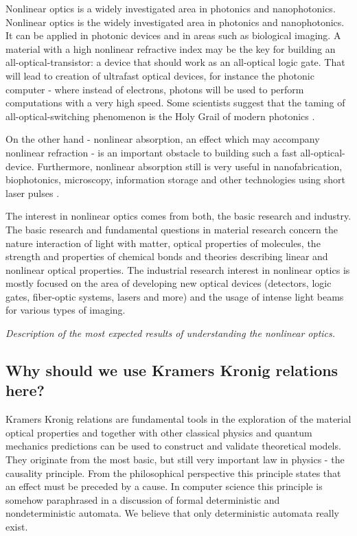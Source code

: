 \documentclass[12pt,twoside,a4paper]{article}
\numberwithin{equation}{subsection}
\numberwithin{figure}{subsection}
\begin{document}
Nonlinear optics is a widely investigated area in photonics and nanophotonics. Nonlinear optics is the widely investigated area
in photonics and nanophotonics. It can be applied in photonic devices and in areas such as biological imaging. A material
with a high nonlinear refractive index may be the key for building an all-optical-transistor: a device that should work as an
all-optical logic gate. That will lead to creation of ultrafast optical devices, for instance the photonic computer - where
instead of electrons, photons will be used to perform computations with a very high speed. Some scientists suggest that the taming
of all-optical-switching phenomenon is the Holy Grail of modern photonics \cite{samoc_nlo_opt_mat}.

On the other hand - nonlinear absorption, an effect which may accompany nonlinear refraction - is an important obstacle
to building such a fast all-optical-device. Furthermore, nonlinear absorption still is very useful in nanofabrication,
biophotonics, microscopy, information storage and other technologies using short laser pulses \cite{samoc_nlo_absorption}. 

The interest in nonlinear optics comes from both, the basic research and industry. The basic research and fundamental questions in
material research concern the nature interaction of light with matter, optical properties of molecules, the strength and properties of
chemical bonds and theories describing linear and nonlinear optical properties. The industrial research interest in nonlinear
optics is mostly focused on the area of developing new optical devices (detectors, logic gates, fiber-optic systems, lasers and
more) and the usage of intense light beams for various types of imaging.

\textit{Description of the most expected results of understanding the nonlinear optics.}

\subsection{Why should we use Kramers Kronig relations here?} \label{chap:introducion_kk}

Kramers Kronig relations are fundamental tools in the exploration of the material optical properties and together with other classical
physics and quantum mechanics predictions can be used to construct and validate theoretical models. They originate from the most
basic, but still very important law in physics - the causality principle. From the philosophical perspective this principle states
that an effect must be preceded by a cause. In computer science this principle is somehow paraphrased in a discussion of formal
deterministic and nondeterministic automata. We believe that only deterministic automata really exist. 
\end{document}
